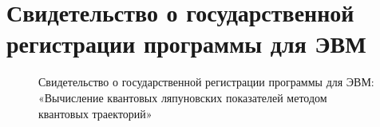 \chapter{Свидетельство о государственной регистрации программы для ЭВМ}\label{app:A}

\begin{figure}[h]
	\caption[Свидетельство о государственной регистрации программы для ЭВМ]{
		Свидетельство о государственной регистрации программы для ЭВМ: «Вычисление квантовых ляпуновских показателей методом квантовых траекторий»
	}
\end{figure}

%
%
%
%
